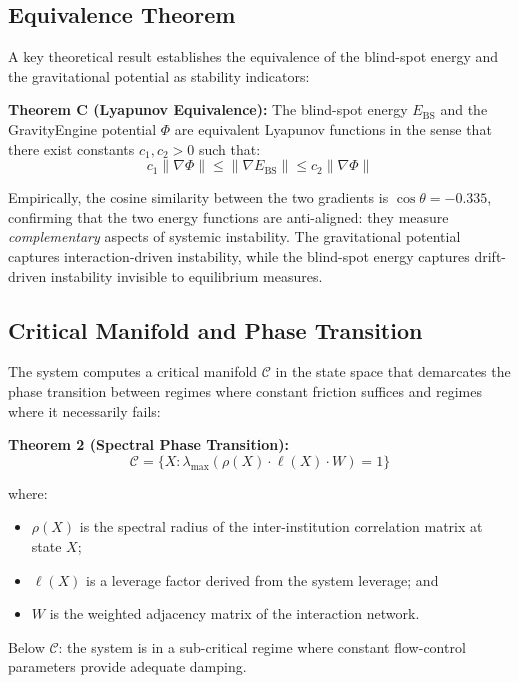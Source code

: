 \documentclass[12pt,a4paper]{article}
\begin{document}
\subsection{Equivalence Theorem}

A key theoretical result establishes the equivalence of the blind-spot 
energy and the gravitational potential as stability indicators:

\textbf{Theorem C (Lyapunov Equivalence):} The blind-spot energy 
$E_{\text{BS}}$ and the GravityEngine potential $\Phi$ are equivalent 
Lyapunov functions in the sense that there exist constants $c_1, c_2 > 0$ 
such that:
\begin{equation}
c_1 \|\nabla\Phi\| \leq \|\nabla E_{\text{BS}}\| \leq c_2 \|\nabla\Phi\|
\end{equation}

Empirically, the cosine similarity between the two gradients is 
$\cos\theta = -0.335$, confirming that the two energy functions are 
anti-aligned: they measure \emph{complementary} aspects of systemic 
instability. The gravitational potential captures interaction-driven 
instability, while the blind-spot energy captures drift-driven instability 
invisible to equilibrium measures.

\subsection{Critical Manifold and Phase Transition}

The system computes a critical manifold $\mathcal{C}$ in the state space 
that demarcates the phase transition between regimes where constant friction 
suffices and regimes where it necessarily fails:

\textbf{Theorem 2 (Spectral Phase Transition):}
\begin{equation}
\mathcal{C} = \{X : \lambda_{\max}(\rho(X) \cdot \ell(X) \cdot W) = 1\}
\end{equation}

where:
\begin{itemize}
\item $\rho(X)$ is the spectral radius of the inter-institution correlation 
matrix at state $X$;
\item $\ell(X)$ is a leverage factor derived from the system leverage; and
\item $W$ is the weighted adjacency matrix of the interaction network.
\end{itemize}

Below $\mathcal{C}$: the system is in a sub-critical regime where constant 
flow-control parameters provide adequate damping.
\end{document}
